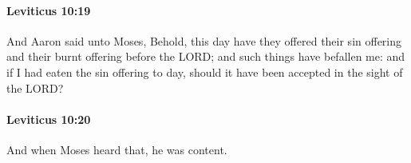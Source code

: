 		\paragraph{Leviticus 10:19} %
			\label{LEVITICUS-10-19}

			And Aaron said unto Moses, Behold, this day have they offered their sin offering and their burnt offering before the LORD; and such things have befallen me: and if I had eaten the sin offering to day, should it have been accepted in the sight of the LORD?


		\paragraph{Leviticus 10:20} %
			\label{LEVITICUS-10-20}

			And when Moses heard that, he was content.

